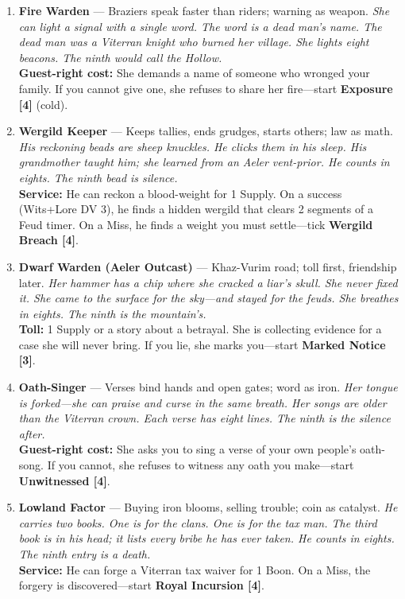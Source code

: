 \begin{enumerate}
\item \textbf{Fire Warden} --- Braziers speak faster than riders; warning as weapon.
  \hfill \textit{She can light a signal with a single word. The word is a dead man's name. The dead man was a Viterran knight who burned her village. She lights eight beacons. The ninth would call the Hollow.} \\
  \textbf{Guest-right cost:} She demands a name of someone who wronged your family. If you cannot give one, she refuses to share her fire---start \textbf{Exposure [4]} (cold).

\item \textbf{Wergild Keeper} --- Keeps tallies, ends grudges, starts others; law as math.
  \hfill \textit{His reckoning beads are sheep knuckles. He clicks them in his sleep. His grandmother taught him; she learned from an Aeler vent-prior. He counts in eights. The ninth bead is silence.} \\
  \textbf{Service:} He can reckon a blood-weight for 1 Supply. On a success (Wits+Lore DV 3), he finds a hidden wergild that clears 2 segments of a Feud timer. On a Miss, he finds a weight you must settle---tick \textbf{Wergild Breach [4]}.

\item \textbf{Dwarf Warden (Aeler Outcast)} --- Khaz-Vurim road; toll first, friendship later.
  \hfill \textit{Her hammer has a chip where she cracked a liar's skull. She never fixed it. She came to the surface for the sky---and stayed for the feuds. She breathes in eights. The ninth is the mountain's.} \\
  \textbf{Toll:} 1 Supply or a story about a betrayal. She is collecting evidence for a case she will never bring. If you lie, she marks you---start \textbf{Marked Notice [3]}.

\item \textbf{Oath-Singer} --- Verses bind hands and open gates; word as iron.
  \hfill \textit{Her tongue is forked---she can praise and curse in the same breath. Her songs are older than the Viterran crown. Each verse has eight lines. The ninth is the silence after.} \\
  \textbf{Guest-right cost:} She asks you to sing a verse of your own people's oath-song. If you cannot, she refuses to witness any oath you make---start \textbf{Unwitnessed [4]}.

\item \textbf{Lowland Factor} --- Buying iron blooms, selling trouble; coin as catalyst.
  \hfill \textit{He carries two books. One is for the clans. One is for the tax man. The third book is in his head; it lists every bribe he has ever taken. He counts in eights. The ninth entry is a death.} \\
  \textbf{Service:} He can forge a Viterran tax waiver for 1 Boon. On a Miss, the forgery is discovered---start \textbf{Royal Incursion [4]}.


\end{enumerate}
